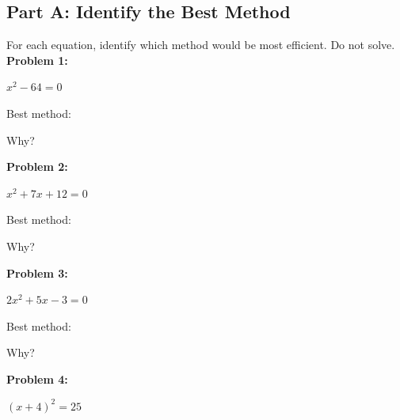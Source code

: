 \documentclass[12pt]{article}
\begin{document}
		\subsection*{Part A: Identify the Best Method}

			For each equation, identify which method would be most efficient. Do not solve.\\

			\textbf{Problem 1:}
            
            $x^2 - 64 = 0$

			\vspace{2cm}

			Best method: \underline{\hspace{3in}}

			\vspace{0.4cm}

			Why? \underline{\hspace{4in}}

			\vspace{1cm}

			\textbf{Problem 2:}
            
            $x^2 + 7x + 12 = 0$

			\vspace{2cm}

			Best method: \underline{\hspace{3in}}

			\vspace{0.4cm}

			Why? \underline{\hspace{4in}}

			\vspace{1cm}

			\textbf{Problem 3:}
            
            $2x^2 + 5x - 3 = 0$

			\vspace{2cm}

			Best method: \underline{\hspace{3in}}

			\vspace{0.4cm}

			Why? \underline{\hspace{4in}}

			\newpage

			\textbf{Problem 4:}
            
            $(x + 4)^2 = 25$

			\vspace{2cm}
\end{document}

